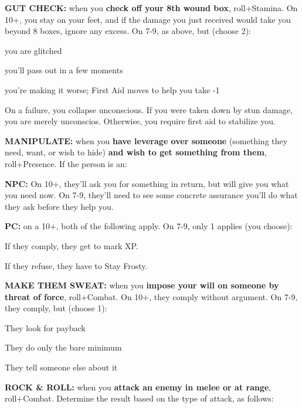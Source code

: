 \documentclass[oneside,10pt]{article}
\begin{document}
\begin{multicols}{2}
\textbf{GUT CHECK:} when you \textbf{check off your 8th wound box},
roll+Stamina. On 10+, you stay on your feet, and if the damage you just received would take you beyond 8 boxes, ignore
any excess. On 7-9, as above, but (choose 2):
\begin{adjustwidth*}{.5cm}{.5cm}

\tcirc{} you are glitched

\tcirc{} you’ll pass out in a few moments

\tcirc{} you’re making it worse; First Aid moves to help you
take -1
\end{adjustwidth*}

On a failure, you collapse unconscious. If you were taken
down by stun damage, you are merely unconscios. Otherwise, you require first aid to stabilize you.

\textbf{MANIPULATE:} when you \textbf{have leverage over someone}
(something they need, want, or wish to hide) \textbf{and wish to
get something from them}, roll+Presence. If the
person is an:
\begin{adjustwidth*}{.5cm}{.5cm}

\textbf{NPC:} On 10+, they’ll ask you for something in return,
but will give you what you need now. On 7-9, they’ll
need to see some concrete assurance you’ll do what
they ask before they help you.

\textbf{PC:} on a 10+, both of the following apply. On 7-9, only
1 applies (you choose):
\begin{adjustwidth*}{.5cm}{.5cm}
\tcirc{} If they comply, they get to mark XP.

\tcirc{} If they refuse, they have to Stay Frosty.
\end{adjustwidth*}
\end{adjustwidth*}

\textbf{MAKE THEM SWEAT:} when you \textbf{impose your will on someone by threat of force}, roll+Combat. On 10+, they comply
without argument. On 7-9, they comply, but (choose
1):
\begin{adjustwidth*}{.5cm}{.5cm}

\tcirc{} They look for payback

\tcirc{} They do only the bare minimum

\tcirc{} They tell someone else about it
\end{adjustwidth*}

\textbf{ROCK \& ROLL:} when you \textbf{attack an
  enemy in melee or at
range}, roll+Combat. Determine the result based on the type
of attack, as follows:
\begin{adjustwidth*}{.5cm}{.5cm}


\end{adjustwidth*}
\end{multicols}
\end{document}
